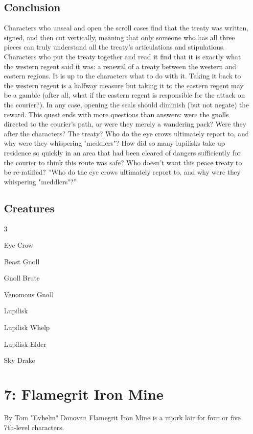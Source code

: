 \documentclass[10pt,a4paper,twoside,twocolumn,openany,bg=print,nodeprecatedcode]{dndbook}
\begin{document}
\section{Conclusion}
Characters who unseal and open the scroll cases find that the treaty was written, signed, and then cut vertically, meaning that only someone who has all three pieces can truly understand all the treaty's articulations and stipulations. Characters who put the treaty together and read it find that it is exactly what the western regent said it was: a renewal of a treaty between the western and eastern regions. It is up to the characters what to do with it. Taking it back to the western regent is a halfway measure but taking it to the eastern regent may be a gamble (after all, what if the eastern regent is responsible for the attack on the courier?). In any case, opening the seals should diminish (but not negate) the reward.
This quest ends with more questions than answers: were the gnolls directed to the courier's path, or were they merely a wandering pack? Were they after the characters? The treaty? Who do the eye crows ultimately report to, and why were they whispering "meddlers"? How did so many lupilisks take up residence so quickly in an area that had been cleared of dangers sufficiently for the courier to think this route was safe? Who doesn't want this peace treaty to be re-ratified?
\DndQuote%
{}
{''Who do the eye crows ultimately report to, and why were they whispering "meddlers"?''}
{}
\section{Creatures}

\begin{itemize}
\begin{multicols}{3}
\item Eye Crow
\item Beast Gnoll
\item Gnoll Brute
\item Venomous Gnoll
\item Lupilisk
\item Lupilisk Whelp
\item Lupilisk Elder
\item Sky Drake
\end{multicols}

\end{itemize}

\chapter{7: Flamegrit Iron Mine}
By Tom "Evhelm" Donovan
Flamegrit Iron Mine is a mjork lair for four or five 7th-level characters.
\end{document}
